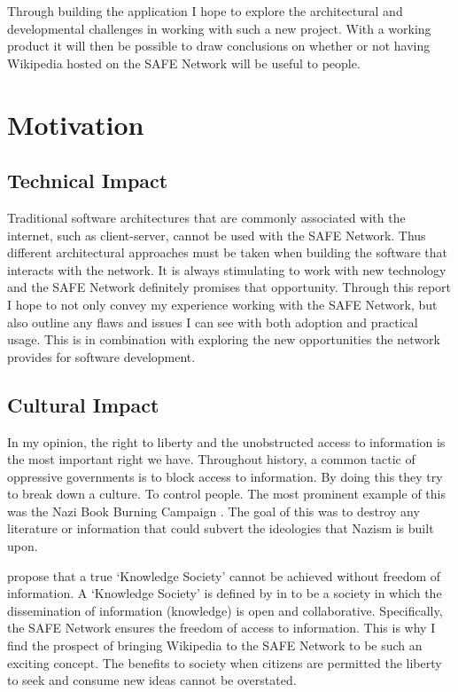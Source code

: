 Through building the application I hope to explore the architectural and developmental challenges in working with such a new project. With a working product it will then be possible to draw conclusions on whether or not having Wikipedia hosted on the SAFE Network will be useful to people.

\section{Motivation}

\subsection{Technical Impact}

Traditional software architectures that are commonly associated with the internet, such as client-server, cannot be used with the SAFE Network. Thus different architectural approaches must be taken when building the software that interacts with the network. It is always stimulating to work with new technology and the SAFE Network definitely promises that opportunity. Through this report I hope to not only convey my experience working with the SAFE Network, but also outline any flaws and issues I can see with both adoption and practical usage. This is in combination with exploring the new opportunities the network provides for software development.

\subsection{Cultural Impact}

In my opinion, the right to liberty and the unobstructed access to information is the most important right we have. Throughout history, a common tactic of oppressive governments is to block access to information. By doing this they try to break down a culture. To control people. The most prominent example of this was the Nazi Book Burning Campaign \cite{book-burning}. The goal of this was to destroy any literature or information that could subvert the ideologies that Nazism is built upon.

\citeauthor{doi:10.1177/0165551506075327} propose that a true `Knowledge Society' cannot be achieved without freedom of information\cite{doi:10.1177/0165551506075327}. A `Knowledge Society' is defined by \citeauthor{binde2005towards} in \cite{binde2005towards} to be a society in which the dissemination of information (knowledge) is open and collaborative. Specifically, the SAFE Network ensures the freedom of access to information. This is why I find the prospect of bringing Wikipedia to the SAFE Network to be such an exciting concept. The benefits to society when citizens are permitted the liberty to seek and consume new ideas cannot be overstated.

